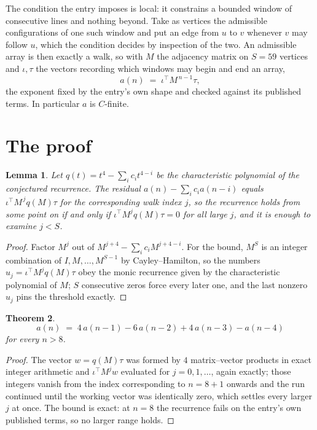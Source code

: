 \documentclass[11pt,a4paper]{article}
\theoremstyle{plain}
\newtheorem{theorem}{Theorem}
\newtheorem{lemma}[theorem]{Lemma}
\theoremstyle{definition}
\begin{document}
The condition the entry imposes is local: it constrains a bounded window of consecutive lines and nothing beyond. Take as
vertices the admissible configurations of one such window and put an edge from $u$ to $v$
whenever $v$ may follow $u$, which the condition decides by inspection of the two. An
admissible array is then exactly a walk, so with $M$ the adjacency matrix on $S=59$ vertices
and $\iota,\tau$ the vectors recording which windows may begin and end an array,
\[
a(n)\;=\;\iota^{\!\top}M^{\,n-1}\tau ,
\]
the exponent fixed by the entry's own shape and checked against its published terms. In
particular $a$ is $C$-finite.

\section{The proof}

\begin{lemma}\label{lem:crit}
Let $q(t)=t^{4}-\sum_i c_it^{4-i}$ be the characteristic polynomial of the
conjectured recurrence. The residual $a(n)-\sum_ic_ia(n-i)$ equals
$\iota^{\!\top}M^{\,j}q(M)\tau$ for the corresponding walk index $j$, so the recurrence
holds from some point on if and only if $\iota^{\!\top}M^{j}q(M)\tau=0$ for all large $j$,
and it is enough to examine $j<S$.
\end{lemma}

\begin{proof}
Factor $M^{j}$ out of $M^{j+4}-\sum_ic_iM^{j+4-i}$. For the bound, $M^{S}$
is an integer combination of $I,M,\dots,M^{S-1}$ by Cayley--Hamilton, so the numbers
$u_j=\iota^{\!\top}M^{j}q(M)\tau$ obey the monic recurrence given by the characteristic
polynomial of $M$; $S$ consecutive zeros force every later one, and the last nonzero $u_j$
pins the threshold exactly.
\end{proof}

\begin{theorem}
\[
a(n)\;=\;4\,a(n-1) - 6\,a(n-2) + 4\,a(n-3) - a(n-4)
\]
for every $n>8$.
\end{theorem}

\begin{proof}
The vector $w=q(M)\tau$ was formed by $4$ matrix--vector products in exact integer
arithmetic and $\iota^{\!\top}M^{j}w$ evaluated for $j=0,1,\dots$, again exactly; those
integers vanish from the index corresponding to $n=8+1$ onwards and the run continued
until the working vector was identically zero, which settles every larger $j$ at once. The bound is exact: at $n=8$ the recurrence fails on the entry's own published terms, so no larger range holds.
\end{proof}
\end{document}
